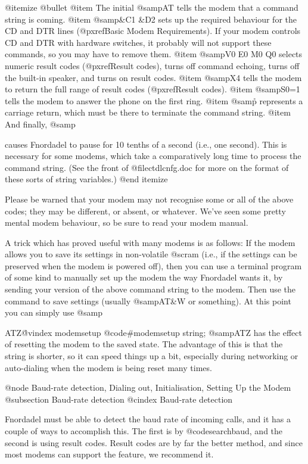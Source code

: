 @itemize @bullet
@item
The initial @samp{AT} tells the modem that a command
string is coming.
@item
@samp{&C1 &D2} sets up the required behaviour for the
CD and DTR lines (@pxref{Basic Modem Requirements}).  If your
modem controls CD and DTR with hardware switches,
it probably will not support these commands, so you may have to
remove them.
@item
@samp{V0 E0 M0 Q0} selects numeric result codes (@pxref{Result codes}),
turns off command echoing, turns
off the built-in speaker, and turns on result codes.
@item
@samp{X4} tells the modem to return the full range of
result codes (@pxref{Result codes}).
@item
@samp{S0=1} tells the modem to answer the phone on the
first ring.
@item
@samp{\r} represents a carriage return, which must be
there to terminate the command string.
@item
And finally, @samp{%
causes Fnordadel to pause for 10 tenths of a
second (i.e., one second).  This is necessary for
some modems, which take a comparatively long time
to process the command string.  (See the front of
@file{ctdlcnfg.doc} for more on the format of these sorts
of string variables.)
@end itemize

Please be warned that your modem may not recognise
some or all of the above codes; they may be different, or
absent, or whatever.  We've seen some pretty mental modem
behaviour, so be sure to read your modem manual.

A trick which has proved useful with many modems
is as follows:  If the modem allows you to save its
settings in non-volatile @sc{ram} (i.e., if the settings can be
preserved when the modem is powered off), then you can use
a terminal program of some kind to manually set up the
modem the way Fnordadel wants it, by sending your version
of the above command string to the modem.  Then use the command
to save settings (usually @samp{AT&W} or something).  At this
point you can simply use @samp{ATZ\r%
@vindex modemsetup
@code{#modemsetup}
string; @samp{ATZ} has the effect of resetting the modem to the
saved state.  The advantage of this is that the string is
shorter, so it can speed things up a bit, especially during
networking or auto-dialing when the modem is being reset
many times.

@node Baud-rate detection, Dialing out, Initialisation, Setting Up the Modem
@subsection Baud-rate detection
@cindex Baud-rate detection

Fnordadel must be able to detect the baud rate
of incoming calls, and it has a couple of ways to
accomplish this.  The first is by @code{searchbaud}, and the
second is using result codes.  Result codes are by far the
better method, and since most modems can support the
feature, we recommend it.

}}
